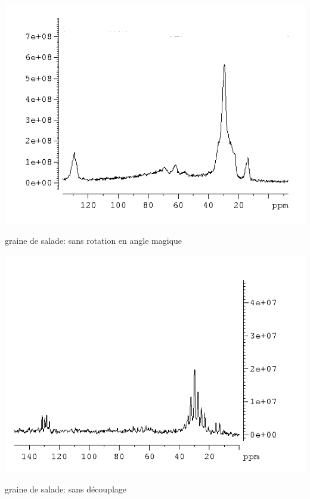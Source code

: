 \documentclass[a4paper,12pt]{scrartcl}
\begin{document}
 \begin{figurehere}
     \begin{minipage}{0.45\textwidth}
      \centering
     \includegraphics[width=\textwidth]{bilder/graine_sans_rot.png}   
     \caption{graine de salade: sans rotation en angle magique}    
   \end{minipage}
   \hfill
   \begin{minipage}[H]{0.45\textwidth}
        \centering
       	\includegraphics[width=\textwidth]{bilder/graine_sans_decouplage.png}
        \caption{graine de salade: sans découplage}
   \end{minipage}
    \end{figurehere}
\end{document}
